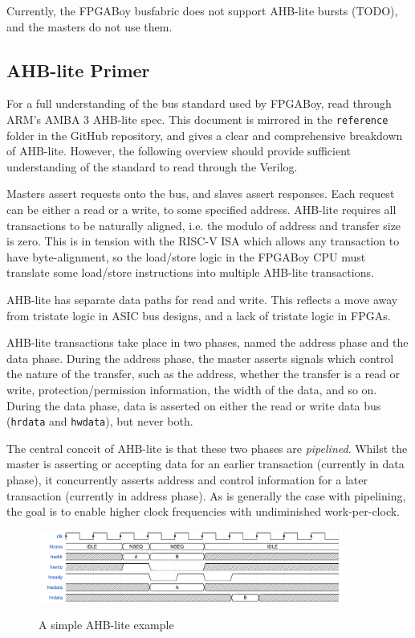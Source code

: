 \documentclass{article}
\begin{document}
Currently, the FPGABoy busfabric does not support AHB-lite bursts (TODO), and the masters do not use them.

\subsection{AHB-lite Primer}

For a full understanding of the bus standard used by FPGABoy, read through ARM's AMBA 3 AHB-lite spec. This document is mirrored in the \texttt{reference} folder in the GitHub repository, and gives a clear and comprehensive breakdown of AHB-lite. However, the following overview should provide sufficient understanding of the standard to read through the Verilog.

Masters assert requests onto the bus, and slaves assert responses. Each request can be either a read or a write, to some specified address. AHB-lite requires all transactions to be naturally aligned, i.e. the modulo of address and transfer size is zero. This is in tension with the RISC-V ISA which allows any transaction to have byte-alignment, so the load/store logic in the FPGABoy CPU must translate some load/store instructions into multiple AHB-lite transactions.

AHB-lite has separate data paths for read and write. This reflects a move away from tristate logic in ASIC bus designs, and a lack of tristate logic in FPGAs.

AHB-lite transactions take place in two phases, named the address phase and the data phase. During the address phase, the master asserts signals which control the nature of the transfer, such as the address, whether the transfer is a read or write, protection/permission information, the width of the data, and so on. During the data phase, data is asserted on either the read or write data bus (\texttt{hrdata} and \texttt{hwdata}), but never both.

The central conceit of AHB-lite is that these two phases are \textit{pipelined}. Whilst the master is asserting or accepting data for an earlier transaction (currently in data phase), it concurrently asserts address and control information for a later transaction (currently in address phase). As is generally the case with pipelining, the goal is to enable higher clock frequencies with undiminished work-per-clock.

\begin{figure}[H]
\centering
\caption{A simple AHB-lite example}
\includegraphics[width=0.9\textwidth]{waves/ahbl_basic.pdf}
\label{diagram:ahbl_basic}
\end{figure}
\end{document}
